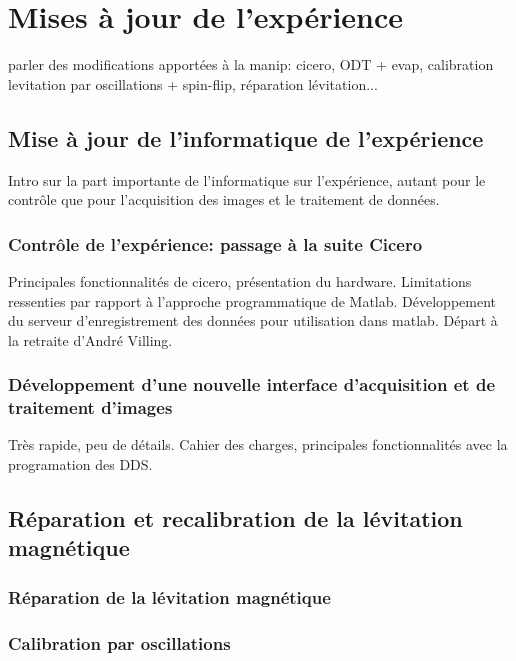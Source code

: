 \chapter{Mises à jour de l'expérience}
\label{ch:new_exp}


parler des modifications apportées à la manip: cicero, ODT + evap, calibration levitation par oscillations + spin-flip, réparation lévitation...

\section{Mise à jour de l'informatique de l'expérience}
Intro sur la part importante de l'informatique sur l'expérience, autant pour le contrôle que pour l'acquisition des images et le traitement de données. 
\subsection{Contrôle de l'expérience: passage à la suite Cicero}
\label{sc:cicero}
Principales fonctionnalités de cicero, présentation du hardware. Limitations ressenties par rapport à l'approche programmatique de Matlab. Développement du serveur d'enregistrement des données pour utilisation dans matlab. Départ à la retraite d'André Villing. 

\subsection{Développement d'une nouvelle interface d'acquisition et de traitement d'images}
Très rapide, peu de détails. Cahier des charges, principales fonctionnalités avec la programation des DDS. 





\section{Réparation et recalibration de la lévitation magnétique}
\subsection{Réparation de la lévitation magnétique}
\label{sc:levitation}
\subsection{Calibration par oscillations}
